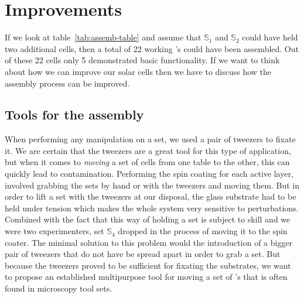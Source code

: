 
\section{Improvements}
If we look at table~\ref{tab:assemb-table} and assume that $\mathbb{S}_1$ and $\mathbb{S}_2$ could have held two additional cells, then a total of 22 working \BHSC’s could have been assembled. Out of these 22 cells only 5 demonstrated basic functionality. If we want to think about how we can improve our solar cells then we have to discuss how the assembly process can be improved.

\subsection{Tools for the assembly}
When performing any manipulation on a set, we used a pair of tweezers to fixate it. We are certain that the tweezers are a great tool for this type of application, but when it comes to \emph{moving} a set of cells from one table to the other, this can quickly lead to contamination. Performing the spin coating for each active layer, involved grabbing the sets by hand or with the tweezers and moving them. But in order to lift a set with the tweezers at our disposal, the glass substrate had to be held under tension which makes the whole system very sensitive to perturbations. Combined with the fact that this way of holding a set is subject to skill and we were two experimenters, set $\mathbb{S}_4$ dropped in the process of moving it to the spin coater.\mypar
The minimal solution to this problem would the introduction of a bigger pair of tweezers that do not have be spread apart in order to grab a set. But because the tweezers proved to be sufficient for fixating the substrates, we want to propose an established multipurpose tool for moving a set of \BHSC's that is often found in microscopy tool sets.

